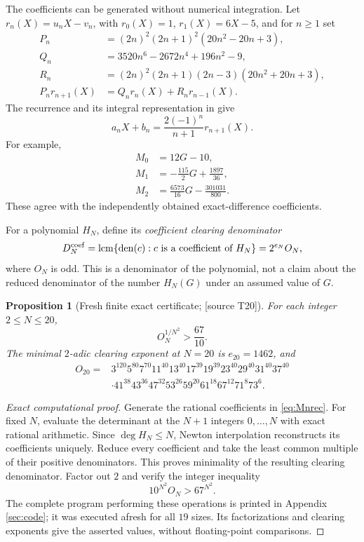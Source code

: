 \documentclass[11pt,a4paper]{article}
\newtheorem{proposition}[theorem]{Proposition}
\theoremstyle{definition}\newtheorem{definition}[theorem]{Definition}
\theoremstyle{remark}\newtheorem{remark}[theorem]{Remark}
\newcommand{\sourceT}[1]{\textup{[source T#1]}}
\begin{document}
The coefficients can be generated without numerical integration. Let $r_n(X)=u_nX-v_n$, with $r_0(X)=1$, $r_1(X)=6X-5$, and for $n\ge1$ set
\begin{align*}
 P_n&=(2n)^2(2n+1)^2(20n^2-20n+3),\\
 Q_n&=3520n^6-2672n^4+196n^2-9,\\
 R_n&=(2n)^2(2n+1)(2n-3)(20n^2+20n+3),\\
 P_nr_{n+1}(X)&=Q_nr_n(X)+R_nr_{n-1}(X).
\end{align*}
The recurrence and its integral representation in \cite[Theorem 2]{Z02} give
\begin{equation}\label{eq:Mnrec}
 a_nX+b_n=\frac{2(-1)^n}{n+1}r_{n+1}(X).
\end{equation}
For example,
\begin{align*}
 M_0&=12G-10,\\
 M_1&=-\frac{115}{2}G+\frac{1897}{36},\\
 M_2&=\frac{6573}{16}G-\frac{301031}{800}.
\end{align*}
These agree with the independently obtained exact-difference coefficients.

For a polynomial $H_N$, define its \emph{coefficient clearing denominator}
\[
 D_N^{\mathrm{coef}}=\operatorname{lcm}\{\operatorname{den}(c):c\text{ is a coefficient of }H_N\}
 =2^{e_N}O_N,
\]
where $O_N$ is odd. This is a denominator of the polynomial, not a claim about the reduced denominator of the number $H_N(G)$ under an assumed value of $G$.

\begin{proposition}[Fresh finite exact certificate; \sourceT{20}]\label{prop:finite}
For each integer $2\le N\le20$,
\[
 O_N^{1/N^2}>\frac{67}{10}.
\]
The minimal $2$-adic clearing exponent at $N=20$ is $e_{20}=1462$, and
\begin{align*}
 O_{20}={}&3^{120}5^{80}7^{70}11^{40}13^{40}17^{39}19^{39}
 23^{40}29^{40}31^{40}37^{40}\\
 &\cdot41^{38}43^{36}47^{32}53^{26}59^{20}61^{18}67^{12}71^8 73^6.
\end{align*}
\end{proposition}
\begin{proof}[Exact computational proof]
Generate the rational coefficients in \eqref{eq:Mnrec}. For fixed $N$, evaluate the determinant at the $N+1$ integers $0,\ldots,N$ with exact rational arithmetic. Since $\deg H_N\le N$, Newton interpolation reconstructs its coefficients uniquely. Reduce every coefficient and take the least common multiple of their positive denominators. This proves minimality of the resulting clearing denominator. Factor out $2$ and verify the integer inequality
\[
 10^{N^2}O_N>67^{N^2}.
\]
The complete program performing these operations is printed in Appendix \ref{sec:code}; it was executed afresh for all $19$ sizes. Its factorizations and clearing exponents give the asserted values, without floating-point comparisons.
\end{proof}
\end{document}

